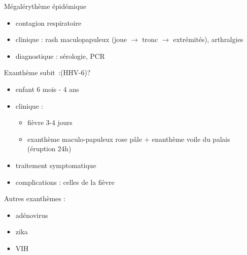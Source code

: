 \documentclass{article}
\begin{document}
\begin{figure}
\end{figure}


Mégalérythème épidémique

\begin{itemize}
\item
  contagion respiratoire
\item
  clinique : rash maculopapuleux (joue $\to$ tronc
  $\to$ extrémités), arthralgies
\item
  diagnostique : sérologie, PCR
\end{itemize}

Exanthème subit~:(HHV-6)?

\begin{itemize}
\item
  enfant 6 mois - 4 ans
\item
  clinique :

  \begin{itemize}
  \item
    fièvre 3-4 jours
  \item
    exanthème maculo-papuleux rose pâle + enanthème voile du palais
    (éruption 24h)
  \end{itemize}
\item
  traitement symptomatique
\item
  complications : celles de la fièvre
\end{itemize}

Autres exanthèmes :

\begin{itemize}
\item
  adénovirus
\item
  zika
\item
  VIH
\end{itemize}
\end{document}
